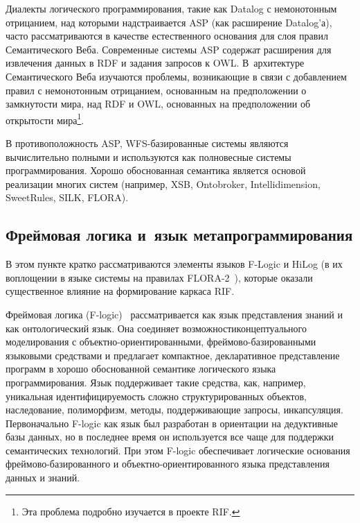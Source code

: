 \begin{multicols}{2}
Диалекты логического программирования, такие как Datalog с немонотонным отрицанием, 
над которыми надстраивается ASP (как расширение Datalog'а), часто рассматриваются в 
качестве естественного основания для слоя правил Семантического Веба. Современные 
системы ASP содержат расширения для извлечения данных в RDF и задания запросов к OWL. 
В~архитектуре Семантического Веба изучаются проблемы, возникающие в связи с 
добавлением правил с немонотонным отрицанием, основанным на предположении о 
замкнутости мира, над RDF и OWL, основанных на предположении об открытости 
мира\footnote{Эта проблема подробно изучается в проекте RIF.}.

В противоположность ASP, WFS-базированные системы являются вычислительно полными 
и используются как полновесные системы программирования. Хорошо обоснованная 
семантика является основой реализации многих систем (например, XSB, Ontobroker, 
Intellidimension, SweetRules, SILK, FLORA).
   
   \subsection{Фреймовая логика и~язык метапрограммирования} %

В этом пункте кратко рассматриваются элементы языков F-Logic и HiLog (в их воплощении 
в языке системы на правилах FLORA-2~\cite{34kal}), которые оказали существенное 
влияние на формирование каркаса RIF.

Фреймовая логика (F-logic)~\cite{35kal, 36kal} рас\-смат\-ри\-ва\-ет\-ся как язык представления 
знаний и как онтологический язык. Она соединяет возможности\linebreak концептуального 
моделирования с объект\-но-ори\-ен\-ти\-ро\-ван\-ны\-ми, фрей\-мо\-во-ба\-зи\-ро\-ван\-ны\-ми языковыми 
средствами и предлагает компактное, декларативное представление программ в хорошо\linebreak 
обоснованной семантике логического языка программирования. Язык поддерживает такие 
средства, как, например, уникальная идентифицируемость сложно структурированных 
объектов,\linebreak
 наследование, полиморфизм, методы, поддерживающие запросы, инкапсуляция. 
Первоначально F-logic как язык был разработан в ориентации на дедуктивные базы данных, 
но в последнее время он используется все чаще для поддержки семантических технологий. 
При этом F-logic обеспечивает логические основания фрей\-мо\-во-базированного и 
объектно-ориентированного языка представления данных и знаний.


\end{multicols}
